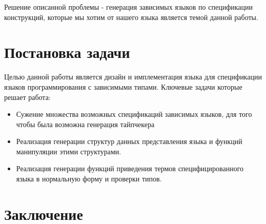 \documentclass{spbau-diploma}
\begin{document}
Решение описанной проблемы - генерация зависимых языков по спецификации конструкций, которые мы хотим от нашего языка является темой данной работы.

\section{Постановка задачи}

Целью данной работы является дизайн и имплементация языка для спецификации языков программирования с зависимыми типами. Ключевые задачи которые решает работа:
\begin{itemize}
  \item Сужение множества возможных спецификаций зависимых языков, для того чтобы была возможна генерация тайпчекера
  \item Реализация генерации структур данных представления языка и функций манипуляции этими структурами.
  \item Реализация генерации функций приведения термов специфицированного языка в нормальную форму и проверки типов.
\end{itemize}





\section*{Заключение}





\end{document}
